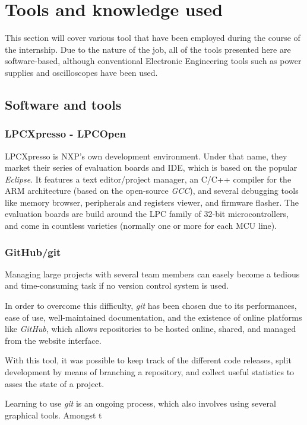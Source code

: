 \section{Tools and knowledge used}
This section will cover various tool that have been employed during the course of the internship.
Due to the nature of the job, all of the tools presented here are software-based, although conventional Electronic Engineering tools such as power supplies and oscilloscopes have been used.

\subsection{Software and tools}

\subsubsection{LPCXpresso - LPCOpen}
LPCXpresso is NXP's own development environment.
Under that name, they market their series of evaluation boards and IDE, which is based on the popular \emph{Eclipse}. 
It features a text editor/project manager, an C/C++ compiler for the ARM architecture (based on the open-source \emph{GCC}), and several debugging tools like memory browser, peripherals and registers viewer, and firmware flasher.
The evaluation boards are build around the LPC family of 32-bit microcontrollers, and come in countless varieties (normally one or more for each MCU line).


\subsubsection{GitHub/git}
Managing large projects with several team members can easely become a tedious and time-consuming task if no version control system is used. 

In order to overcome this difficulty, \emph{git} has been chosen due to its performances, ease of use, well-maintained documentation, and the existence of online platforms like \emph{GitHub}, which allows repositories to be hosted online, shared, and managed from the website interface.

With this tool, it was possible to keep track of the different code releases, split development by means of branching a repository, and collect useful statistics to asses the state of a project.

Learning to use \emph{git} is an ongoing process, which also involves using several graphical tools.
Amongst t


